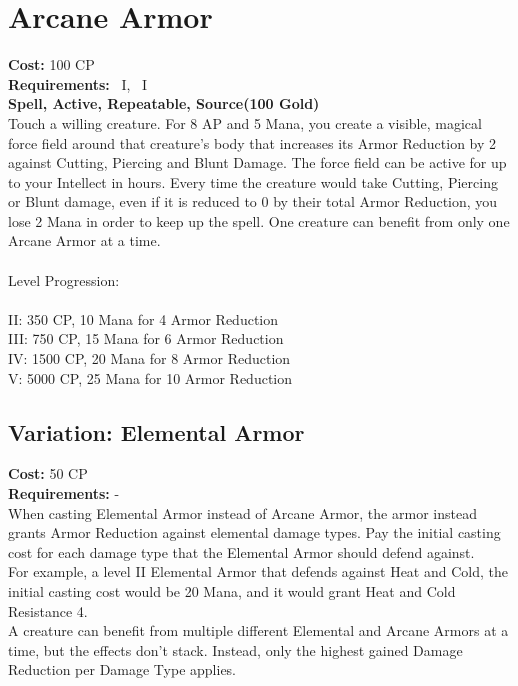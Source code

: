 \section{Arcane Armor}\label{spell:arcaneArmor}
\textbf{Cost:} 100 CP\\
\textbf{Requirements:}~ I,~ I\\
\textbf{Spell, Active, Repeatable, Source(100 Gold)}\\
Touch a willing creature.
For 8 AP and 5 Mana, you create a visible, magical force field around that creature's body that increases its Armor Reduction by 2 against Cutting, Piercing and Blunt Damage.
The force field can be active for up to your Intellect in hours.
Every time the creature would take Cutting, Piercing or Blunt damage, even if it is reduced to 0 by their total Armor Reduction, you lose 2 Mana in order to keep up the spell.
One creature can benefit from only one Arcane Armor at a time.\\
\\
Level Progression:\\
\\
II: 350 CP, 10 Mana for 4 Armor Reduction\\
III: 750 CP, 15 Mana for 6 Armor Reduction\\
IV: 1500 CP, 20 Mana for 8 Armor Reduction\\
V: 5000 CP, 25 Mana for 10 Armor Reduction\\

\subsection{Variation: Elemental Armor}\label{spell:elementalArmor}
\textbf{Cost:} 50 CP\\
\textbf{Requirements:} -\\
When casting Elemental Armor instead of Arcane Armor, the armor instead grants Armor Reduction against elemental damage types.
Pay the initial casting cost for each damage type that the Elemental Armor should defend against.\\
For example, a level II Elemental Armor that defends against Heat and Cold, the initial casting cost would be 20 Mana, and it would grant Heat and Cold Resistance 4.\\
A creature can benefit from multiple different Elemental and Arcane Armors at a time, but the effects don't stack.
Instead, only the highest gained Damage Reduction per Damage Type applies.